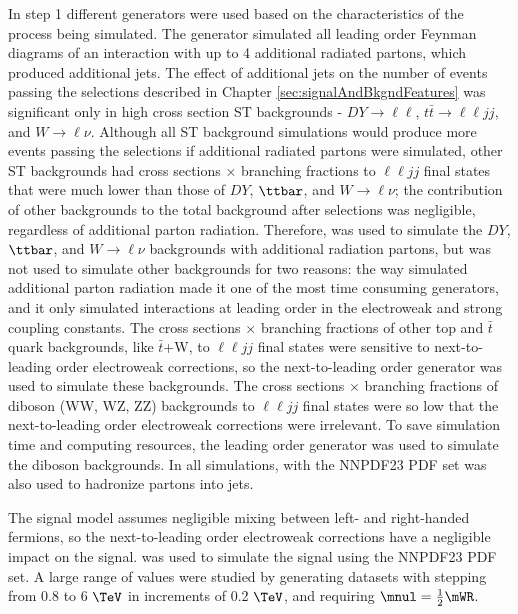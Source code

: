 In step 1 different \MC generators were used based on the characteristics of the process being simulated.  The 
\MADGRAPH \cite{madgraph} generator simulated all leading order Feynman diagrams of an interaction with up to 4 
additional radiated partons, which produced additional jets.  The effect of additional jets on the number of 
events passing the selections described in Chapter \ref{sec:signalAndBkgndFeatures} was significant 
only in high cross section ST backgrounds - $DY \rightarrow \ell\ell$, $t\bar{t} \rightarrow \ell\ell jj$, and 
$W \rightarrow \ell\nu$.  Although all ST background simulations would produce more events passing the 
selections if additional radiated partons were simulated, other ST backgrounds had 
cross sections $\times$ branching fractions to $\ell\ell jj$ final states that were much lower than those of $DY$, 
$\ttbar$, and $W \rightarrow \ell\nu$; the contribution of other backgrounds to the total background after selections 
was negligible, regardless of additional parton radiation.  Therefore, \MADGRAPH was used to simulate the $DY$, $\ttbar$, and 
$W \rightarrow \ell\nu$ backgrounds with additional radiation partons, but was not used to simulate other backgrounds 
for two reasons: the way \MADGRAPH simulated additional parton radiation made it one of the most time consuming generators, and 
it only simulated interactions at leading order in the electroweak and strong coupling constants.  The cross sections 
$\times$ branching fractions of other top and $\bar{t}$ quark backgrounds, like $\bar{t}$+W, to $\ell\ell jj$ final 
states were sensitive to next-to-leading order electroweak corrections, so the next-to-leading order \POWHEG \cite{powheg} generator 
was used to simulate these backgrounds.  The cross sections $\times$ branching fractions of diboson (WW, WZ, ZZ) backgrounds 
to $\ell\ell jj$ final states were so low that the next-to-leading order electroweak corrections were irrelevant.  
To save simulation time and computing resources, the leading order \PYTHIA \cite{pythia8,Sjostrand:2006za} generator 
was used to simulate the diboson backgrounds.  In all simulations, \PYTHIA with the NNPDF23 PDF set \cite{nnpdf} 
was also used to hadronize partons into jets.

The \WR signal model assumes negligible mixing between left- and right-handed fermions, so the next-to-leading 
order electroweak corrections have a negligible impact on the signal.  \PYTHIA was used to simulate the 
\WR signal using the NNPDF23 PDF set.  A large range of \mWR values were studied by generating datasets with \mWR 
stepping from 0.8 to 6 $\TeV$ in increments of 0.2 $\TeV$, and requiring $\mnul = \frac{1}{2}\mWR$.

